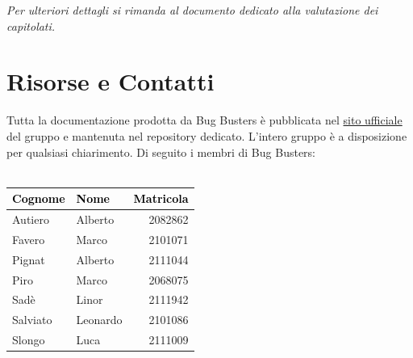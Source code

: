 \documentclass[a4paper,11pt]{article}
\begin{document}
\vspace{1em}

\begin{tcolorbox}[
    colback=lightgray,
    colframe=secondarycolor,
    arc=2mm,
    boxrule=0pt,
    left=10pt,
    right=10pt,
    top=8pt,
    bottom=8pt
]
    \small\textit{Per ulteriori dettagli si rimanda al documento dedicato alla valutazione dei capitolati.}
\end{tcolorbox}


\section*{Risorse e Contatti}

Tutta la documentazione prodotta da Bug Busters è pubblicata nel \href{https://bugbustersunipd.github.io/BugBusterSite/}{sito ufficiale} del gruppo e mantenuta nel repository dedicato.
L'intero gruppo è a disposizione per qualsiasi chiarimento. Di seguito i membri di Bug Busters: \\ \\ 
\begin{center}
\setlength{\arrayrulewidth}{0.8pt}
\begin{tabular}{|l|l|r|}
\hline
\rowcolor{primarycolor!20}
\textcolor{black}{\textbf{Cognome}} & \textcolor{black}{\textbf{Nome}} & \textcolor{black}{\textbf{Matricola}} \\
\hline
Autiero & Alberto & 2082862 \\
\hline
Favero & Marco & 2101071 \\
\hline
Pignat & Alberto & 2111044 \\
\hline
Piro & Marco & 2068075 \\
\hline
Sadè & Linor & 2111942 \\
\hline
Salviato & Leonardo & 2101086 \\
\hline
Slongo & Luca & 2111009 \\
\hline
\end{tabular}
\end{center}
\end{document}
